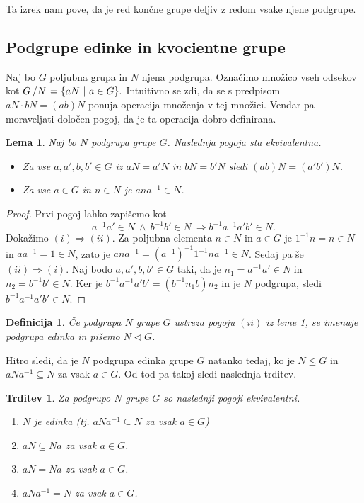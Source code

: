 \documentclass[10pt, a4paper]{article}
\newtheorem{trditev}[izr]{Trditev}
\newtheorem{defi}{Definicija}[section]
\newenvironment{noticeB}{%
  \tcolorbox[%
  notitle,
  empty,
  enhanced,  %
  breakable,
  coltext=black,
  colback=white, 
  fontupper=\rmfamily,
  parbox=false,
  noparskip,
  sharp corners,
  boxrule=-1pt,  %
  frame hidden,
  left=7pt,  %
  right=7pt,
  top=5pt,
  bottom=5pt,
  before skip=2.5ex plus 2pt,
  after skip=2.5ex plus 2pt,
  borderline west = {1.5pt}{-0.1pt}{blue!30!black}, %
  overlay unbroken and last={%
    \draw[color=black, line width=1.25pt]
    ($(frame.south west)+(1.pt, -0.1pt)$) -- ++(2em, 0);
  }
  ]}
{\endtcolorbox}
\newenvironment{definicija}{\begin{defi}\begin{noticeB}}{%
    \end{noticeB}\end{defi}}
\newtheorem{lema}[izr]{Lema}
\newenvironment{noticeC}{%
  \tcolorbox[%
  notitle,
  empty,
  enhanced,  %
  breakable,
  coltext=black, 
  fontupper=\rmfamily,
  parbox=false,
  noparskip,
  sharp corners,
  boxrule=-1pt,  %
  frame hidden,
  left=7pt,  %
  right=7pt,
  top=5pt,
  bottom=5pt,
  before skip=2.5ex plus 2pt,
  after skip=2.5ex plus 2pt,
  overlay unbroken and last={%
  },
  ]}
{\endtcolorbox}
\newenvironment{dokaz}%
  {\begin{noticeC}\begin{proof}}%
  {\end{proof}\end{noticeC}}
\newcommand{\quot}[2]{{\raisebox{0em}{$#1$}\left/\raisebox{0em}{$#2$}\right.}}
\begin{document}
Ta izrek nam pove, da je red končne grupe deljiv z redom vsake njene podgrupe.

\subsection{Podgrupe edinke in kvocientne grupe}

Naj bo $G$ poljubna grupa in $N$ njena podgrupa.
Označimo množico vseh odsekov kot $\quot{G}{N} = \{aN\ |\ a \in G\}.$
Intuitivno se zdi, da se s predpisom $aN \cdot bN = (ab) N$ ponuja operacija množenja
v tej množici. Vendar pa moraveljati določen pogoj, da je ta operacija dobro definirana.

\begin{lema}\label{lem:1}
  Naj bo $N$ podgrupa grupe $G$. Naslednja pogoja sta ekvivalentna.
  \begin{itemize}
    \item Za vse $a, a', b, b' \in G$ iz $aN = a'N$ in $bN = b'N$ sledi $(ab) N = (a'b') N$.
    \item Za vse $a \in G$ in $n \in N$ je $a n a^{-1} \in N$.
  \end{itemize}
\end{lema}

\begin{dokaz}
  Prvi pogoj lahko zapišemo kot 
  $$a^{-1}a' \in N\ \land\ b^{-1} b' \in N\ \Rightarrow b^{-1} a^{-1} a'b' \in N.$$
  Dokažimo $(i) \Rightarrow (ii)$. Za poljubna elementa $n \in N$ in $a \in G$
  je $1^{-1}n = n \in N$ in $a a^{-1} = 1 \in N$, zato je $a n a^{-1} = (a^{-1})^{-1} 1^{-1} n a^{-1} \in N$.
  Sedaj pa še $(ii) \Rightarrow (i)$. Naj bodo $a, a', b, b' \in G$ taki, 
  da je $n_1 = a^{-1}a' \in N$ in $n_2 = b^{-1} b' \in N$.
  Ker je $b^{-1} a^{-1} a' b' = (b^{-1} n_1 b) n_2$ in je $N$ podgrupa,
  sledi $b^{-1} a^{-1} a'b' \in N$.
\end{dokaz}

\begin{definicija}
  Če podgrupa $N$ grupe $G$ ustreza pogoju $(ii)$ iz leme \ref{lem:1},
  se imenuje podgrupa edinka in pišemo $N \lhd G$.
\end{definicija}

Hitro sledi, da je $N$ podgrupa edinka grupe $G$ natanko tedaj, ko je $N \leq G$ in $a N a^{-1} \subseteq N$
za vsak $a \in G$. Od tod pa takoj sledi naslednja trditev.

\begin{trditev}\label{trd:1}
  Za podgrupo $N$ grupe $G$ so naslednji pogoji ekvivalentni.
  \begin{enumerate}
    \item $N$ je edinka (tj. $a N a^{-1} \subseteq N$ za vsak $a \in G$)
    \item $aN \subseteq Na$ za vsak $a \in G$.
    \item $aN = N a$ za vsak $a \in G$.
    \item $a N a^{-1} = N$ za vsak $a \in G$.
  \end{enumerate}
\end{trditev}
\end{document}
